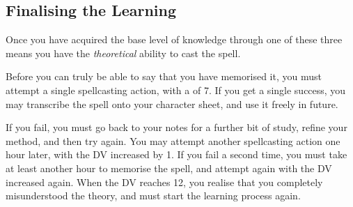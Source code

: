 \subsection{Finalising the Learning}

Once you have acquired the base level of knowledge through one of these three means you have the {\it theoretical} ability to cast the spell. 

Before you can truly be able to say that you have memorised it, you must attempt a single spellcasting action, with a  of 7. If you get a single success, you may transcribe the spell onto your character sheet, and use it freely in future. 

If you fail, you must go back to your notes for a further bit of study, refine your method, and then try again. You may attempt another spellcasting action one hour later, with the DV increased by 1. If you fail a second time, you must take at least another hour to memorise the spell, and attempt again with the DV increased again. When the DV reaches 12, you realise that you completely misunderstood the theory, and must start the learning process again. 
